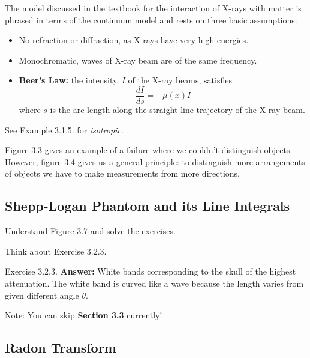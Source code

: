 The model discussed in the textbook for the interaction of X-rays with matter is phrased in terms of the continuum model and rests on three basic assumptions:
\begin{itemize}
    \item[(1)] No refraction or diffraction, as X-rays have very high energies.
    \item[(2)] Monochromatic, waves of X-ray beam are of the same frequency.
    \item[(3)] \textbf{Beer's Law:} the intensity, $I$ of the X-ray beams, satisfies
    \[\frac{d I}{ds}=-\mu(x)I\] where $s$ is the arc-length along the straight-line trajectory of the X-ray beam.
\end{itemize} 

\begin{Definition} See Example 3.1.5. \cite{epstein2007introduction} for \textit{isotropic}.
\end{Definition}

Figure 3.3 gives an example of a failure where we couldn't distinguish objects. However, figure 3.4 gives us a general principle: to distinguish more arrangements of objects we have to make measurements from more directions.

\subsection{Shepp-Logan Phantom and its Line Integrals}

Understand Figure 3.7 and solve the exercises.

\begin{Exercise} 
    Think about Exercise 3.2.3.
\end{Exercise}

\begin{Exercise}{Exercise 3.2.3.} \textbf{Answer:} White bands corresponding to the skull of the highest attenuation. The white band is curved like a wave because the length varies from given different angle $\theta$.
\end{Exercise}


Note: You can skip \textbf{Section 3.3} currently!

\subsection{Radon Transform} 

